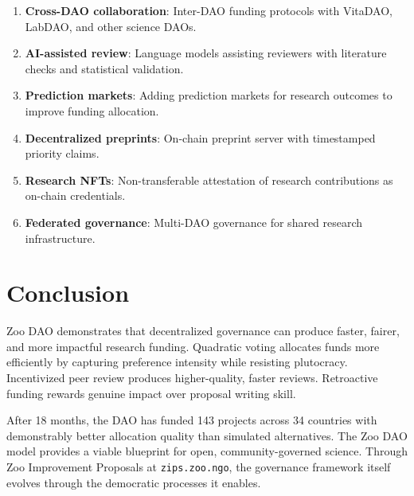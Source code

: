 \documentclass[11pt,a4paper]{article}
\begin{document}
\begin{enumerate}
  \item \textbf{Cross-DAO collaboration}: Inter-DAO funding protocols
    with VitaDAO, LabDAO, and other science DAOs.
  \item \textbf{AI-assisted review}: Language models assisting reviewers
    with literature checks and statistical validation.
  \item \textbf{Prediction markets}: Adding prediction markets for
    research outcomes to improve funding allocation.
  \item \textbf{Decentralized preprints}: On-chain preprint server with
    timestamped priority claims.
  \item \textbf{Research NFTs}: Non-transferable attestation of research
    contributions as on-chain credentials.
  \item \textbf{Federated governance}: Multi-DAO governance for shared
    research infrastructure.
\end{enumerate}


\section{Conclusion}
\label{sec:conclusion}

Zoo DAO demonstrates that decentralized governance can produce faster,
fairer, and more impactful research funding. Quadratic voting allocates
funds more efficiently by capturing preference intensity while resisting
plutocracy. Incentivized peer review produces higher-quality, faster
reviews. Retroactive funding rewards genuine impact over proposal writing
skill.

After 18 months, the DAO has funded 143 projects across 34 countries with
demonstrably better allocation quality than simulated alternatives. The
Zoo DAO model provides a viable blueprint for open, community-governed
science. Through Zoo Improvement Proposals at \texttt{zips.zoo.ngo}, the
governance framework itself evolves through the democratic processes it
enables.




\end{document}
